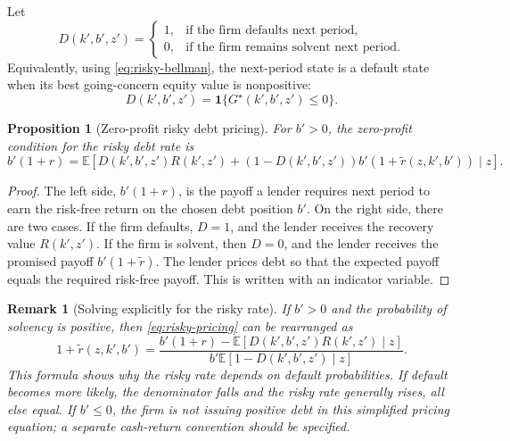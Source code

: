 \documentclass[11pt]{article}
\newtheorem{proposition}{Proposition}
\newtheorem{remark}{Remark}
\newcommand{\E}{\mathbb{E}}
\newcommand{\1}{\mathbf{1}}
\begin{document}
Let
\[
  D(k',b',z')=
  \begin{cases}
    1, & \text{if the firm defaults next period},\\
    0, & \text{if the firm remains solvent next period}.
  \end{cases}
\]
Equivalently, using \cref{eq:risky-bellman}, the next-period state is a default
state when its best going-concern equity value is nonpositive:
\begin{equation}
  D(k',b',z')=\1\{G^\star(k',b',z')\le 0\}.
  \label{eq:default-set}
\end{equation}

\begin{proposition}[Zero-profit risky debt pricing]
\label{prop:risky-pricing}
For \(b'>0\), the zero-profit condition for the risky debt rate is
\begin{equation}
  b'(1+r)
  =
  \E\left[
    D(k',b',z')R(k',z')
    +(1-D(k',b',z'))b'(1+\widetilde r(z,k',b'))
    \mid z
  \right].
  \label{eq:risky-pricing}
\end{equation}
\end{proposition}

\begin{proof}
The left side, \(b'(1+r)\), is the payoff a lender requires next period to earn
the risk-free return on the chosen debt position \(b'\). On the right side,
there are two cases. If the firm defaults, \(D=1\), and the lender receives the
recovery value \(R(k',z')\). If the firm is solvent, then \(D=0\), and the lender
receives the promised payoff \(b'(1+\widetilde r)\). The lender prices debt so
that the expected payoff equals the required risk-free payoff. This is
\citet[eq. (3.27)]{strebulaev2012dynamic} written with an indicator variable.
\end{proof}

\begin{remark}[Solving explicitly for the risky rate]
\label{rem:explicit-rate}
If \(b'>0\) and the probability of solvency is positive, then
\cref{eq:risky-pricing} can be rearranged as
\begin{equation}
  1+\widetilde r(z,k',b')
  =
  \frac{
    b'(1+r)-\E[D(k',b',z')R(k',z')\mid z]
  }{
    b'\E[1-D(k',b',z')\mid z]
  }.
  \label{eq:explicit-rate}
\end{equation}
This formula shows why the risky rate depends on default probabilities. If
default becomes more likely, the denominator falls and the risky rate generally
rises, all else equal. If \(b'\le 0\), the firm is not issuing positive debt in
this simplified pricing equation; a separate cash-return convention should be
specified.
\end{remark}
\end{document}
